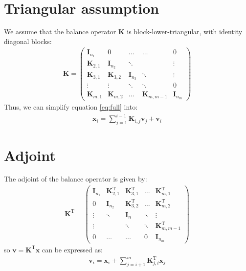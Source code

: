 \documentclass[12pt]{scrartcl}
\begin{document}
\section{Triangular assumption}
We assume that the balance operator $\mathbf{K}$ is block-lower-triangular, with identity diagonal blocks:
\begin{align}
\mathbf{K} = \left(\begin{array}{ccccc}
\mathbf{I}_{n_1} & 0 & \dots & \dots & 0 \\
\mathbf{K}_{2,1} & \mathbf{I}_{n_2} & \ddots & & \vdots \\
\mathbf{K}_{3,1} & \mathbf{K}_{3,2} & \mathbf{I}_{n_3} & \ddots & \vdots \\
\vdots & \vdots & \ddots & \ddots & 0 \\
\mathbf{K}_{m,1} & \mathbf{K}_{m,2} & \dots & \mathbf{K}_{m,m-1} & \mathbf{I}_{n_m}
\end{array} \right) 
\end{align}
Thus, we can simplify equation \eqref{eq:full} into:
\begin{align}
\label{eq:triangle}
\mathbf{x}_i = \sum_{j=1}^{i-1} \mathbf{K}_{i,j} \mathbf{v}_j + \mathbf{v}_i
\end{align}

\section{Adjoint}
The adjoint of the balance operator is given by: 
\begin{align}
\mathbf{K}^\mathrm{T} = \left(\begin{array}{ccccc}
\mathbf{I}_{n_1} & \mathbf{K}^\mathrm{T}_{2,1} & \mathbf{K}^\mathrm{T}_{3,1} & \dots & \mathbf{K}^\mathrm{T}_{m,1} \\
0 & \mathbf{I}_{n_2} & \mathbf{K}^\mathrm{T}_{3,2} & \dots & \mathbf{K}^\mathrm{T}_{m,2} \\
\vdots & \ddots & \mathbf{I}_n & \ddots & \vdots \\
\vdots &  & \ddots & \ddots & \mathbf{K}^\mathrm{T}_{m,m-1} \\
0 & \dots & \dots & 0 & \mathbf{I}_{n_m}
\end{array} \right) 
\end{align}
so $\mathbf{v} = \mathbf{K}^\mathrm{T} \mathbf{x}$ can be expressed as:
\begin{align}
\label{eq:triangle_ad}
\mathbf{v}_i = \mathbf{x}_i + \sum_{j=i+1}^{m} \mathbf{K}^\mathrm{T}_{j,i} \mathbf{x}_j
\end{align}
\end{document}
